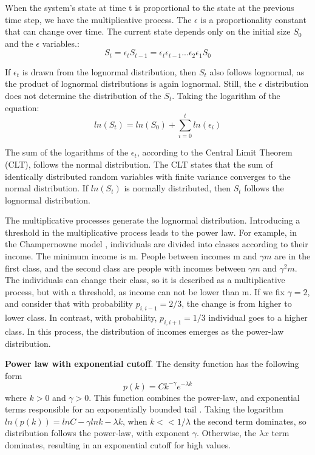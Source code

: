 When the system's state at time t is proportional to the state at the previous time step, we have the multiplicative process. The $\epsilon$ is a proportionality constant that can change over time. The current state depends only on the initial size $S_0$ and the $\epsilon$ variables.:
\begin{equation}
S_t = \epsilon_t S_{t-1} = \epsilon_t \epsilon_{t-1}... \epsilon_2 \epsilon_1 S_{0}
\end{equation}

If $\epsilon_t$ is drawn from the lognormal distribution, then $S_t$ also follows lognormal, as the product of lognormal distributions is again lognormal. Still, the $\epsilon$ distribution does not determine the distribution of the $S_t$. Taking the logarithm of the equation:
\begin{equation}
ln(S_t) = ln(S_0) + \sum_{i=0}^{t} ln(\epsilon_i)
\end{equation}

The sum of the logarithms of the $\epsilon_t$, according to the Central Limit Theorem (CLT), follows the normal distribution. The CLT states that the sum of identically distributed random variables with finite variance converges to the normal distribution. If $ln(S_t)$ is normally distributed, then $S_t$ follows the lognormal distribution.   

The multiplicative processes generate the lognormal distribution. Introducing a threshold in the multiplicative process leads to the power law. For example, in the Champernowne model \cite{caldarelli2007scalefree}, individuals are divided into classes according to their income. The minimum income is m. People between incomes m and $\gamma m$ are in the first class, and the second class are people with incomes between $\gamma m$ and $\gamma^2 m $. The individuals can change their class, so it is described as a multiplicative process, but with a threshold, as income can not be lower than m. If we fix $\gamma=2$, and consider that with probability $p_{i,i-1}=2/3$, the change is from higher to lower class. In contrast, with probability, $p_{i, i+1}=1/3$ individual goes to a higher class. In this process, the distribution of incomes emerges as the power-law distribution.

\textbf{Power law with exponential cutoff}. The density function has the following form 
\begin{equation}
p(k) = C k^{-\gamma}e^{-\lambda k}
\end{equation}
where $k>0$ and $\gamma>0$. This function combines the power-law, and exponential terms responsible for an exponentially bounded tail \cite{barabasi2016network}. Taking the logarithm $ln(p(k)) = lnC - \gamma lnk - \lambda k$, when $k<<1/\lambda$ the second term dominates, so distribution follows the power-law, with exponent $\gamma$. Otherwise, the $\lambda x$ term dominates, resulting in an exponential cutoff for high values. 

